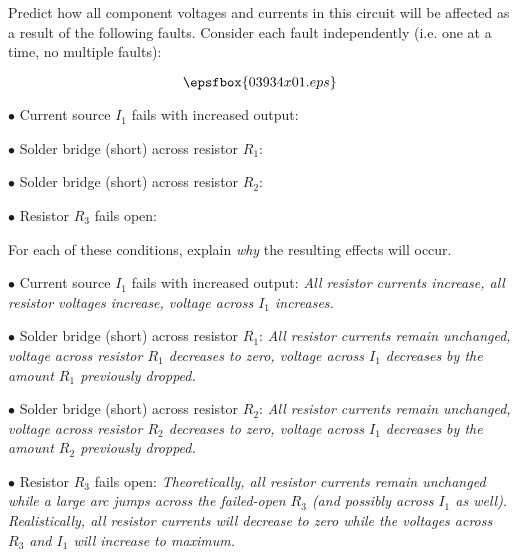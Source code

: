 

Predict how all component voltages and currents in this circuit will be affected as a result of the following faults.  Consider each fault independently (i.e. one at a time, no multiple faults):

$$\epsfbox{03934x01.eps}$$

\medskip
\item{$\bullet$} Current source $I_1$ fails with increased output:
\vskip 5pt
\item{$\bullet$} Solder bridge (short) across resistor $R_1$: 
\vskip 5pt
\item{$\bullet$} Solder bridge (short) across resistor $R_2$: 
\vskip 5pt
\item{$\bullet$} Resistor $R_3$ fails open: 
\medskip

For each of these conditions, explain {\it why} the resulting effects will occur.







\medskip
\item{$\bullet$} Current source $I_1$ fails with increased output: {\it All resistor currents increase, all resistor voltages increase, voltage across $I_1$ increases.}
\vskip 5pt
\item{$\bullet$} Solder bridge (short) across resistor $R_1$: {\it All resistor currents remain unchanged, voltage across resistor $R_1$ decreases to zero, voltage across $I_1$ decreases by the amount $R_1$ previously dropped.}
\vskip 5pt
\item{$\bullet$} Solder bridge (short) across resistor $R_2$: {\it All resistor currents remain unchanged, voltage across resistor $R_2$ decreases to zero, voltage across $I_1$ decreases by the amount $R_2$ previously dropped.}
\vskip 5pt
\item{$\bullet$} Resistor $R_3$ fails open: {\it Theoretically, all resistor currents remain unchanged while a large arc jumps across the failed-open $R_3$ (and possibly across $I_1$ as well).  Realistically, all resistor currents will decrease to zero while the voltages across $R_3$ and $I_1$ will increase to maximum.}
\medskip






